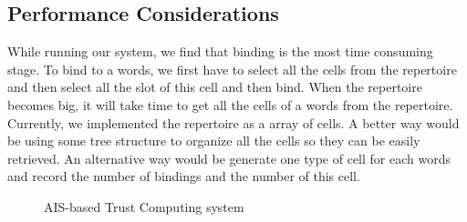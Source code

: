 \documentclass{llncs}
\begin{document}
\subsection{Performance Considerations}
While running our system, we find that binding is the most time consuming stage. To bind to a words, we first have to select all the cells from the repertoire and then select all the slot of this cell and then bind. When the repertoire becomes big, it will take time to get all the cells of a words from the repertoire. Currently, we implemented the repertoire as a array of cells. A better way would be using some tree structure to organize all the cells so they can be easily retrieved. An alternative way would be generate one type of cell for each words and record the number of bindings and the number of this cell. 

\begin{figure}[h]
\begin{center}
\caption{AIS-based Trust Computing system}
\label{fig:arch}
\end{center}
\vspace{-20pt}
\end{figure}
\end{document}
